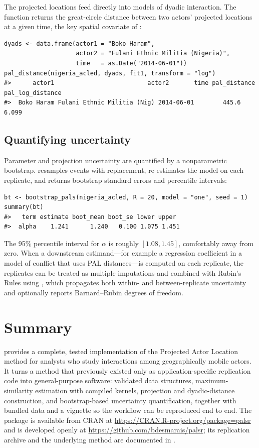 The projected locations feed directly into models of dyadic interaction. The
function  returns the great-circle distance between two
actors' projected locations at a given time, the key spatial covariate of
\citet{kim2023pals}:

\begin{verbatim}
dyads <- data.frame(actor1 = "Boko Haram",
                    actor2 = "Fulani Ethnic Militia (Nigeria)",
                    time   = as.Date("2014-06-01"))
pal_distance(nigeria_acled, dyads, fit1, transform = "log")
#>      actor1                          actor2       time pal_distance pal_log_distance
#>  Boko Haram Fulani Ethnic Militia (Nig) 2014-06-01        445.6            6.099
\end{verbatim}

\subsection{Quantifying uncertainty}

Parameter and projection uncertainty are quantified by a nonparametric bootstrap.
 resamples events with replacement, re-estimates the model
on each replicate, and returns bootstrap standard errors and percentile intervals:

\begin{verbatim}
bt <- bootstrap_pals(nigeria_acled, R = 20, model = "one", seed = 1)
summary(bt)
#>   term estimate boot_mean boot_se lower upper
#>  alpha    1.241      1.240   0.100 1.075 1.451
\end{verbatim}

The 95\% percentile interval for $\alpha$ is roughly $[1.08, 1.45]$, comfortably
away from zero. When a downstream estimand---for example a regression coefficient
in a model of conflict that uses PAL distances---is computed on each replicate, the
replicates can be treated as multiple imputations and combined with Rubin's Rules
\citep{rubin1987} using , which propagates both within- and
between-replicate uncertainty and optionally reports Barnard--Rubin degrees of
freedom.

\section{Summary}

 provides a complete, tested implementation of the Projected Actor
Location method for analysts who study interactions among geographically mobile
actors. It turns a method that previously existed only as application-specific
replication code into general-purpose software: validated data structures,
maximum-similarity estimation with compiled kernels, projection and dyadic-distance
construction, and bootstrap-based uncertainty quantification, together with bundled
data and a vignette so the workflow can be reproduced end to end. The package is
available from CRAN at \url{https://CRAN.R-project.org/package=palsr} and is
developed openly at \url{https://github.com/bdesmarais/palsr}; its replication
archive and the underlying method are documented in \citet{kim2023pals}.

